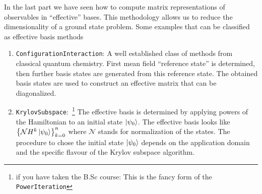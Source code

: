 In the last part we have seen how to compute matrix representations of observables in ``effective'' bases. This methodology allows us to reduce the dimensionality of a ground state problem. 
Some examples that can be classified as effective basis methods
\begin{enumerate}
    \item \texttt{ConfigurationInteraction}: A well established class of methods from classical quantum chemistry. First mean field ``reference state'' is determined, then further basis states are generated from this reference state. The obtained basis states are used to construct an effective matrix that can be diagonalized. 
    \item \texttt{KrylovSubspace}:~\footnote{if you have taken the B.Sc course: This is the fancy form of the \texttt{PowerIteration}} The effective basis is determined by applying powers of the Hamiltonian to an initial state $\ket{\psi_0}$. The effective basis looks like $\left\{ \mathcal{N}H^k\ket{\psi_0} \right\}_{k=0}^n$ where $\mathcal{N}$ stands for normalization of the states. The procedure to chose the initial state $\ket{\psi_0}$ depends on the application domain and the specific flavour of the Krylov subspace algorithm.  
\end{enumerate}

